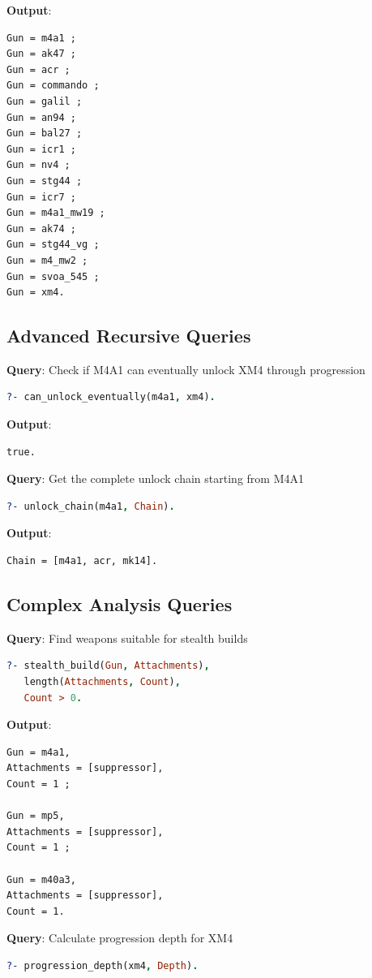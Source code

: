 \documentclass[12pt,a4paper]{article}
\begin{document}
\textbf{Output}:
\begin{lstlisting}
Gun = m4a1 ;
Gun = ak47 ;
Gun = acr ;
Gun = commando ;
Gun = galil ;
Gun = an94 ;
Gun = bal27 ;
Gun = icr1 ;
Gun = nv4 ;
Gun = stg44 ;
Gun = icr7 ;
Gun = m4a1_mw19 ;
Gun = ak74 ;
Gun = stg44_vg ;
Gun = m4_mw2 ;
Gun = svoa_545 ;
Gun = xm4.
\end{lstlisting}

\subsection{Advanced Recursive Queries}

\textbf{Query}: Check if M4A1 can eventually unlock XM4 through progression
\begin{lstlisting}[language=Prolog]
?- can_unlock_eventually(m4a1, xm4).
\end{lstlisting}

\textbf{Output}:
\begin{lstlisting}
true.
\end{lstlisting}

\textbf{Query}: Get the complete unlock chain starting from M4A1
\begin{lstlisting}[language=Prolog]
?- unlock_chain(m4a1, Chain).
\end{lstlisting}

\textbf{Output}:
\begin{lstlisting}
Chain = [m4a1, acr, mk14].
\end{lstlisting}

\subsection{Complex Analysis Queries}

\textbf{Query}: Find weapons suitable for stealth builds
\begin{lstlisting}[language=Prolog]
?- stealth_build(Gun, Attachments),
   length(Attachments, Count),
   Count > 0.
\end{lstlisting}

\textbf{Output}:
\begin{lstlisting}
Gun = m4a1,
Attachments = [suppressor],
Count = 1 ;

Gun = mp5,
Attachments = [suppressor],
Count = 1 ;

Gun = m40a3,
Attachments = [suppressor],
Count = 1.
\end{lstlisting}

\textbf{Query}: Calculate progression depth for XM4
\begin{lstlisting}[language=Prolog]
?- progression_depth(xm4, Depth).
\end{lstlisting}
\end{document}

